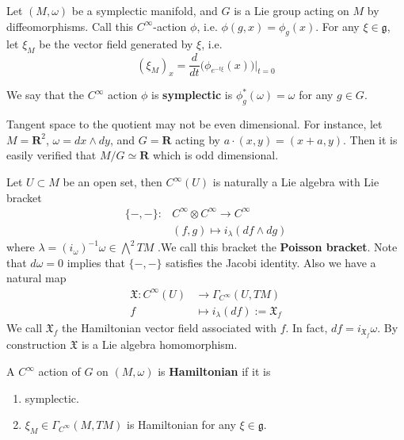 \documentclass[
11pt, %
letterpaper， %
oneside, %
headinclude,footinclude, %
BCOR5mm, %
]{scrartcl}
\newcommand{\R}{{\mathbf{R}}}
\newcommand{\bfs}{\textbf}
\begin{document}
Let $(M, \omega)$ be a symplectic manifold, and $G$ is a Lie group acting on $M$ by diffeomorphisms. Call this $C^{\infty}$-action $\phi$, i.e. $\phi(g,x)=\phi_g(x)$. For any $\xi \in \mathfrak{g}$, let $\xi_M$ be the vector field generated by $\xi$, i.e.
\begin{equation*}
(\xi_M)_x=\frac{d}{dt}\big(\phi_{e^{-t\xi}}(x) \big)\bigg|_{t=0}
\end{equation*}
\begin{definition}
	We say that the $C^{\infty}$ action $\phi$ is \bfs{symplectic} is $\phi^*_g(\omega)=\omega$ for any $g\in G$.
\end{definition}

\begin{rem}
	Tangent space to the quotient may not be even dimensional. For instance, let $M=\R^2$, $\omega=dx\wedge dy$, and $G=\R$ acting by $a\cdot (x,y)=(x+a,y)$. Then it is easily verified that $M/G\simeq \R$ which is odd dimensional.  
\end{rem}
Let $U\subset M$ be an open set, then $C^{\infty}(U)$ is naturally a Lie algebra with Lie bracket
\begin{align*}
\{-,-\}:& C^{\infty}\otimes C^{\infty} \to C^{\infty}\\ &(f,g)\mapsto i_{\lambda} (df\wedge dg)
\end{align*}  where $\lambda=(i_{\omega})^{-1}\omega\in \bigwedge^2 TM$ .We call this bracket the \bfs{Poisson bracket}. Note that $d\omega=0$ implies that $\{-,-\}$ satisfies the Jacobi identity. Also we have a natural map
\begin{align*}
\mathfrak{X}: C^{\infty}(U) &\to \Gamma_{C^{\infty}}(U, TM)\\
f &\mapsto i_{\lambda}(df):=\mathfrak{X}_f
\end{align*}
We call $\mathfrak{X}_f$ the Hamiltonian vector field associated with $f$. In fact, $df=i_{\mathfrak{X}_f}\omega$. By construction $\mathfrak{X}$ is a Lie algebra homomorphism.

\begin{definition}
	A $C^{\infty}$ action of $G$ on $(M,\omega)$ is \bfs{Hamiltonian} if it is 
	\begin{enumerate}
		\item symplectic.
		\item $\xi_M\in \Gamma_{C^{\infty}}(M, TM)$ is Hamiltonian for any $\xi \in \mathfrak{g}$.
	\end{enumerate}
\end{definition}
\end{document}
